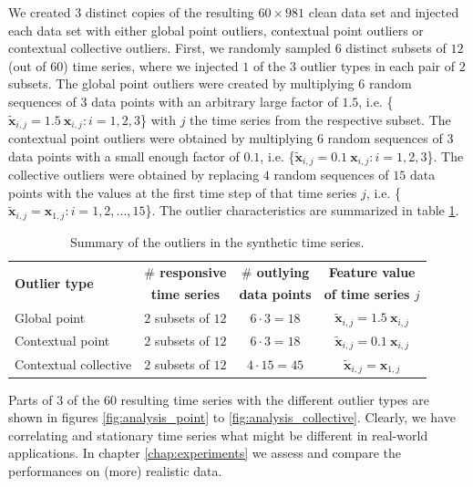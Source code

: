 We created $3$ distinct copies of the resulting $60 \times 981$ clean data set and injected each data set with either global point outliers, contextual point outliers or contextual collective outliers. First, we randomly sampled $6$ distinct subsets of $12$ (out of $60$) time series, where we injected $1$ of the $3$ outlier types in each pair of $2$ subsets. The global point outliers were created by multiplying $6$ random sequences of $3$ data points with an arbitrary large factor of $1.5$, i.e. \{$\tilde{\mathbf{x}}_{i,j} = 1.5 \ \mathbf{x}_{i,j} : i=1,2,3$\} with $j$ the time series from the respective subset. The contextual point outliers were obtained by multiplying $6$ random sequences of $3$ data points with a small enough factor of $0.1$, i.e. \{$\tilde{\mathbf{x}}_{i,j} = 0.1 \ \mathbf{x}_{i,j} : i=1,2,3$\}. The collective outliers were obtained by replacing $4$ random sequences of $15$ data points with the values at the first time step of that time series $j$, i.e. \{$\tilde{\mathbf{x}}_{i,j} = \mathbf{x}_{1,j} : i=1,2,...,15 $\}. The outlier characteristics are summarized in table \ref{tab:analysis_outliers}.

\begin{table}[h]
	\centering
	\caption{Summary of the outliers in the synthetic time series.}
	\label{tab:analysis_outliers}
	\begin{tabular}{l c c c  }
		\toprule	
		\multirow{2}{*}{\textbf{Outlier type}} & \textbf{$\#$ responsive} & \textbf{$\#$ outlying} & \textbf{Feature value} \\
		&  \textbf{time series} & \textbf{data points} & \textbf{of time series $j$} \\
		\midrule
		Global point			& $2$ subsets of $12$	& $6 \cdot 3 = 18$  & $\tilde{\mathbf{x}}_{i,j} = 1.5 \  \mathbf{x}_{i,j}$ 	\\
		Contextual point		& $2$ subsets of $12$ 	& $6 \cdot 3 = 18$  & $\tilde{\mathbf{x}}_{i,j} = 0.1 \  \mathbf{x}_{i,j}$	\\
		Contextual collective	& $2$ subsets of $12$	& $4 \cdot 15 = 45$  & $\tilde{\mathbf{x}}_{i,j} = \mathbf{x}_{1,j}$	\\
		\bottomrule
	\end{tabular}
\end{table}

Parts of $3$ of the $60$ resulting time series with the different outlier types are shown in figures \ref{fig:analysis_point} to \ref{fig:analysis_collective}. Clearly, we have correlating and stationary time series what might be different in real-world applications. In chapter \ref{chap:experiments} we assess and compare the performances on (more) realistic data.

